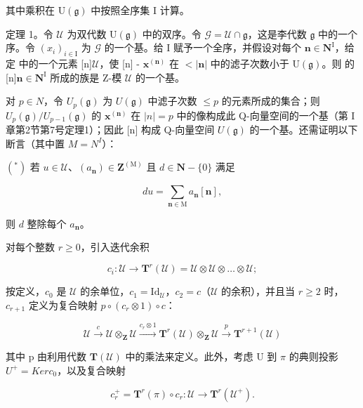 其中乘积在 \(\mathrm{U}(\mathfrak{g})\) 中按照全序集 I 计算。

定理 1。令 \(\mathcal{U}\) 为双代数 \(\mathrm{U}(\mathfrak{g})\) 中的双序。令 \(\mathcal{G} = \mathcal{U} \cap \mathfrak{g}\)，这是李代数 \(\mathfrak{g}\) 中的一个序。令 \((x_i)_{i \in \mathrm{I}}\) 为 \(\mathcal{G}\) 的一个基。给 I 赋予一个全序，并假设对每个 \(\mathbf{n} \in \mathbf{N}^{\mathrm{I}}\)，给定 { 中的一个元素 }[{n}]\(\mathcal{U}\)，使 {[}n{]} - \(\mathbf{x}^{(\mathbf{n})}\) 在 \(< |\mathbf{n}|\) 中的滤子次数小于 \(\mathrm{U}(\mathfrak{g})\)。则 { 的 }[{n}]\(\mathbf{n} \in \mathbf{N}^{\mathrm{I}}\) 所成的族是 Z-模 \(\mathcal{U}\) 的一个基。

对 \(p \in N\)，令 \(U_{p}(\mathfrak{g})\) 为 \(U(\mathfrak{g})\) 中滤子次数 \(\leq p\) 的元素所成的集合；则 \(U_{p}(\mathfrak{g}) / U_{p-1}(\mathfrak{g})\) 的 \(\mathbf{x}^{(\mathbf{n})}\) 在 \(|n| = p\) 中的像构成此 Q-向量空间的一个基（第 I 章第2节第7号定理1）；因此 {[}n{]} 构成 Q-向量空间 \(U(\mathfrak{g})\) 的一个基。还需证明以下断言（其中置 \(M = N^{I}\)）：

\((^{*})\) 若 \(u\in \mathcal{U}\)、\((a_{\mathbf{n}})\in \mathbf{Z}^{(\mathrm{M})}\) 且 \(d\in \mathbf{N} - \{0\}\) 满足

\[
d u = \sum_ {\mathbf {n} \in \mathrm{M}} a _ {\mathbf {n}} [ \mathbf {n} ],\tag{6}
\]

则 \(d\) 整除每个 \(a_{\mathbf{n}}\)。

对每个整数 \(r \geq 0\)，引入迭代余积

\[
c _ {i}: \mathcal {U} \rightarrow \mathbf {T} ^ {r} (\mathcal {U}) = \mathcal {U} \otimes \mathcal {U} \otimes \dots \otimes \mathcal {U};
\]

按定义，\(c_0\) 是 \(\mathcal{U}\) 的余单位，\(c_1 = \mathrm{Id}_{\mathcal{U}}\)，\(c_2 = c\)（\(\mathcal{U}\) 的余积），并且当 \(r \geq 2\) 时，\(c_{r+1}\) 定义为复合映射 \(p \circ (c_r \otimes 1) \circ c\)：

\[
\mathcal {U} \stackrel {{c}} {{\longrightarrow}} \mathcal {U} \otimes_ {\mathbf {Z}} \mathcal {U} \stackrel {{c _ {r} \otimes 1}} {{\longrightarrow}} \mathbf {T} ^ {r} (\mathcal {U}) \otimes_ {\mathbf {Z}} \mathcal {U} \stackrel {{p}} {{\longrightarrow}} \mathbf {T} ^ {r + 1} (\mathcal {U})
\]

其中 p 由利用代数 \(\mathbf{T}(\mathcal{U})\) 中的乘法来定义。此外，考虑 U 到 \(\pi\) 的典则投影 \(U^{+} = Ker c_{0}\)，以及复合映射

\[
c _ {r} ^ {+} = \mathbf {T} ^ {r} (\pi) \circ c _ {r}: \mathcal {U} \to \mathbf {T} ^ {r} (\mathcal {U} ^ {+}).
\]

